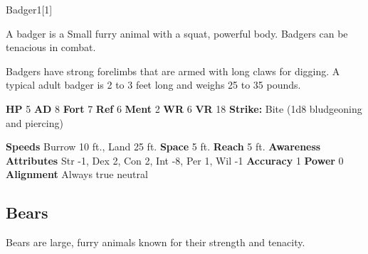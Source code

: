   
  \begin{monsection}{Badger}{1}[1]
    \vspace{-1em}\vspace{-1em}
    \vspace{0em}

    
        A badger is a Small furry animal with a squat, powerful body.
        Badgers can be tenacious in combat.
      
        Badgers have strong forelimbs that are armed with long claws for digging.
        A typical adult badger is 2 to 3 feet long and weighs 25 to 35 pounds.
      

    \begin{spellcontent}
      \begin{spelltargetinginfo}
        \pari \textbf{HP} 5 \monsep
          \textbf{AD} 8 \monsep
          \textbf{Fort} 7 \monsep
          \textbf{Ref} 6 \monsep
          \textbf{Ment} 2
        \pari \textbf{WR} 6 \monsep
        \textbf{VR} 18
        \pari \textbf{Strike:}
            Bite  (1d8 bludgeoning and piercing)
      \end{spelltargetinginfo}
    \end{spellcontent}
    \begin{monsterfooter}
      \pari \textbf{Speeds} Burrow 10 ft., Land 25 ft. \monsep
        \textbf{Space} 5 ft. \monsep
        \textbf{Reach} 5 ft.
      \pari \textbf{Awareness} 
      \pari \textbf{Attributes}
        Str -1, Dex 2,
        Con 2, Int -8,
        Per 1, Wil -1
      \pari \textbf{Accuracy} 1 \monsep
        \textbf{Power} 0
      \pari \textbf{Alignment} Always true neutral
    \end{monsterfooter}
  \end{monsection}
  
  
    \subsection{Bears}
      
        Bears are large, furry animals known for their strength and tenacity.
      

